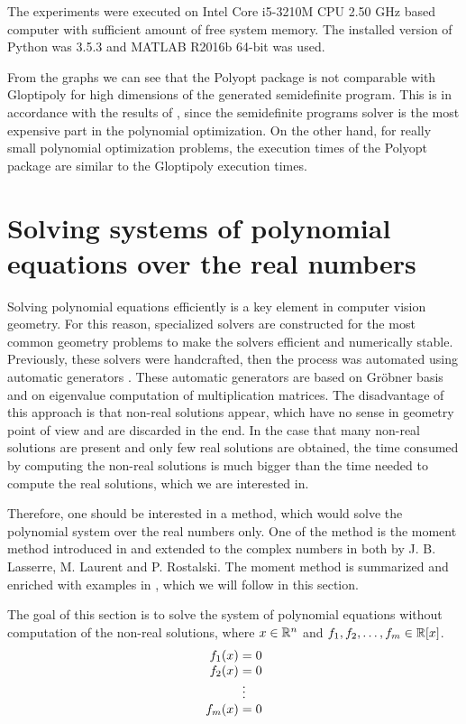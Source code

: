 The experiments were executed on Intel Core i5-3210M CPU 2.50 GHz based computer with sufficient amount of free system memory.
The installed version of Python was 3.5.3 and MATLAB R2016b 64-bit was used.

From the graphs we can see that the Polyopt package is not comparable with Gloptipoly for high dimensions of the generated semidefinite program. This is in accordance with the results of , since the semidefinite programs solver is the most expensive part in the polynomial optimization.
On the other hand, for really small polynomial optimization problems, the execution times of the Polyopt package are  similar to the Gloptipoly execution times.


\section{Solving systems of polynomial equations over the real numbers}
Solving polynomial equations efficiently is a key element in computer vision geometry.
For this reason, specialized solvers are constructed for the most common geometry problems to make the solvers efficient and numerically stable.
Previously, these solvers were handcrafted, then the process was automated using automatic generators \cite{autogen}.
These automatic generators are based on Gr\"obner basis \cite{Becker93} and on eigenvalue computation of multiplication matrices.
The disadvantage of this approach is that non-real solutions appear, which  have no sense in geometry point of view and are discarded in the end.
In the case that many non-real solutions are present and only few real solutions are obtained, the time consumed by computing the non-real solutions is much bigger than the time needed to compute the real solutions, which we are interested in.

Therefore, one should be interested in a method, which would solve the polynomial system over the real numbers only.
One of the method is the moment method introduced in \cite{momentMethodReal} and extended to the complex numbers in \cite{momentMethodComplex} both by J. B. Lasserre, M. Laurent and P. Rostalski.
The moment method is summarized and enriched with examples in \cite{momentMethod}, which we will follow in this section.

The goal of this section is to solve the system of polynomial equations  without computation of the non-real solutions, where $x\in\mathbb{R}^n$ and $f_1,f_2,\ldots,f_m\in\mathbb{R}[x]$.
\begin{align}
  \arraycolsep=1.4pt
  \begin{array}{rl}
    f_1(x) &= 0\\
    f_2(x) &= 0\\
    &\vdots\\
    f_m(x) &= 0
  \end{array}\labeleq{POP:sol:system}
\end{align}

